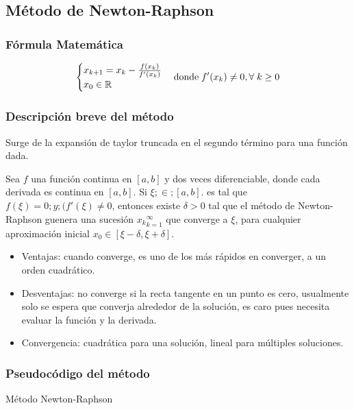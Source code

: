 \documentclass[12pt]{article}
\begin{document}
\subsection{Método de Newton-Raphson}

\subsubsection{Fórmula Matemática}
\[\begin{cases} 
      x_{k+1}= x_k -\frac{f(x_k)}{f'(x_k)}\\
      x_0 \in \mathbb{R}
   \end{cases}\\
   \text{donde}\; f'(x_k) \neq 0, \forall \;k \geq 0
   \]

\subsubsection{Descripción breve del método}
Surge de la expansión de taylor truncada en el segundo término para una función dada.


Sea \(f\) una función continua en \([a,b]\) y dos veces diferenciable, donde cada derivada es continua en \([a,b]\). Si \(\xi; \in; [a,b].\) es tal que \(f(\xi)=0;y;(f'(\xi)\neq0\), entonces existe \(\delta >0\) tal que el método de Newton-Raphson guenera una sucesión \({x_k}_{k=1}^\infty\) que converge a \(\xi\), para cualquier aproximación inicial \(x_0 \in [\xi-\delta,\xi+\delta]\).

\begin{itemize}
    \item Ventajas: cuando converge, es uno de los más rápidos en converger, a un orden cuadrático.
    \item Desventajas: no converge si la recta tangente en un punto es cero, usualmente solo se espera que converja alrededor de la solución, es caro pues necesita evaluar la función y la derivada. 
    \item Convergencia: cuadrática para una solución, lineal para múltiples soluciones.
\end{itemize}

\subsubsection{Pseudocódigo del método}
\begin{algorithm}[H]
\caption{Método Newton-Raphson}
     \SetAlgoLined

\end{algorithm}
\end{document}
